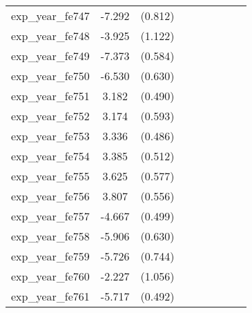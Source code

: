 {\begin{tabular}{l*{4}{cc}}
exp\_year\_fe747&   -7.292\sym{***}&  (0.812)&                  &         &                  &         &                  &         \\
exp\_year\_fe748&   -3.925\sym{***}&  (1.122)&                  &         &                  &         &                  &         \\
exp\_year\_fe749&   -7.373\sym{***}&  (0.584)&                  &         &                  &         &                  &         \\
exp\_year\_fe750&   -6.530\sym{***}&  (0.630)&                  &         &                  &         &                  &         \\
exp\_year\_fe751&    3.182\sym{***}&  (0.490)&                  &         &                  &         &                  &         \\
exp\_year\_fe752&    3.174\sym{***}&  (0.593)&                  &         &                  &         &                  &         \\
exp\_year\_fe753&    3.336\sym{***}&  (0.486)&                  &         &                  &         &                  &         \\
exp\_year\_fe754&    3.385\sym{***}&  (0.512)&                  &         &                  &         &                  &         \\
exp\_year\_fe755&    3.625\sym{***}&  (0.577)&                  &         &                  &         &                  &         \\
exp\_year\_fe756&    3.807\sym{***}&  (0.556)&                  &         &                  &         &                  &         \\
exp\_year\_fe757&   -4.667\sym{***}&  (0.499)&                  &         &                  &         &                  &         \\
exp\_year\_fe758&   -5.906\sym{***}&  (0.630)&                  &         &                  &         &                  &         \\
exp\_year\_fe759&   -5.726\sym{***}&  (0.744)&                  &         &                  &         &                  &         \\
exp\_year\_fe760&   -2.227\sym{*}  &  (1.056)&                  &         &                  &         &                  &         \\
exp\_year\_fe761&   -5.717\sym{***}&  (0.492)&                  &         &                  &         &                  &         \\

\end{tabular}}
